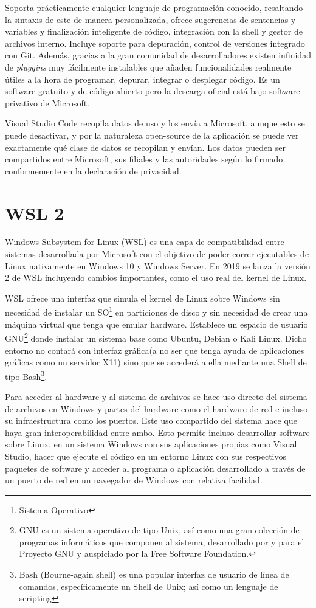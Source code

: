 \documentclass[a4paper, 12pt]{book}
\begin{document}
Soporta prácticamente cualquier lenguaje de programación conocido, resaltando la sintaxis de este de manera personalizada, ofrece sugerencias de sentencias y variables y finalización inteligente de código, integración con la shell y gestor de archivos interno. Incluye soporte para depuración, control de versiones integrado con Git. Además, gracias a la gran comunidad de desarrolladores existen infinidad de \emph{pluggins} muy fácilmente instalables que añaden funcionalidades realmente útiles a la hora de programar, depurar, integrar o desplegar código. 
Es un software gratuito y de código abierto pero la descarga oficial está bajo software privativo de Microsoft. 

Visual Studio Code recopila datos de uso y los envía a Microsoft, aunque esto se puede desactivar, y por la naturaleza open-source de la aplicación se puede ver exactamente qué clase de datos se recopilan y envían. Los datos pueden ser compartidos entre Microsoft, sus filiales y las autoridades según lo firmado conformemente en la declaración de privacidad. 

\section{WSL 2}
Windows Subsystem for Linux (WSL) es una capa de compatibilidad entre sistemas desarrollada por Microsoft con el objetivo de poder correr ejecutables de Linux nativamente en Windows 10 y Windows Server. En 2019 se lanza la versión 2 de WSL incluyendo cambios importantes, como el uso real del kernel de Linux. 

WSL ofrece una interfaz que simula el kernel de Linux sobre Windows sin necesidad de instalar un SO\footnote{Sistema Operativo} en particiones de disco y sin necesidad de crear una máquina virtual que tenga que emular hardware. Establece un espacio de usuario GNU\footnote{GNU es un sistema operativo de tipo Unix, así como una gran colección de programas informáticos que componen al sistema, desarrollado por y para el Proyecto GNU y auspiciado por la Free Software Foundation.} donde instalar un sistema base como Ubuntu, Debian o Kali Linux. Dicho entorno no contará con interfaz gráfica(a no ser que tenga ayuda de aplicaciones gráficas como un servidor X11) sino que se accederá a ella mediante una Shell de tipo Bash\footnote{Bash (Bourne-again shell) es una popular interfaz de usuario de línea de comandos, específicamente un Shell de Unix; así como un lenguaje de scripting}. 

Para acceder al hardware y al sistema de archivos se hace uso directo del sistema de archivos en Windows y partes del hardware como el hardware de red e incluso su infraestructura como los puertos. Este uso compartido del sistema hace que haya gran interoperabilidad entre ambo. Esto permite incluso desarrollar software sobre Linux, en un sistema Windows con sus aplicaciones propias como Visual Studio, hacer que ejecute el código en un entorno Linux con sus respectivos paquetes de software y acceder al programa o aplicación desarrollado a través de un puerto de red en un navegador de Windows con relativa facilidad. 
\end{document}
